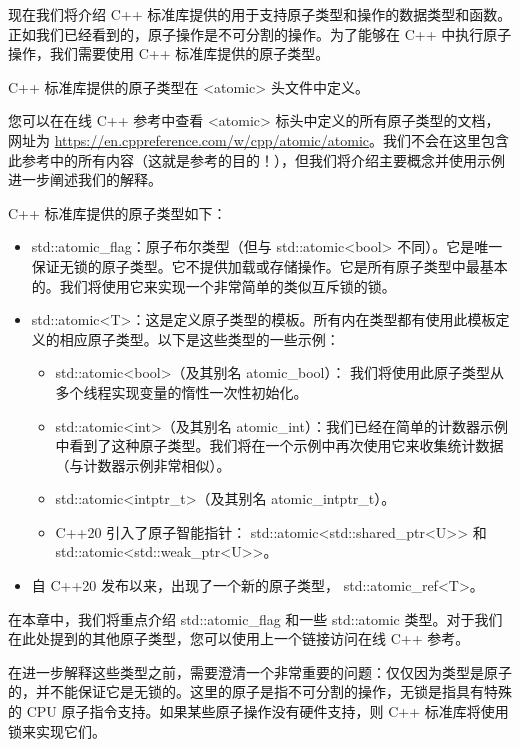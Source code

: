 

现在我们将介绍 C++ 标准库提供的用于支持原子类型和操作的数据类型和函数。正如我们已经看到的，原子操作是不可分割的操作。为了能够在 C++ 中执行原子操作，我们需要使用 C++ 标准库提供的原子类型。



C++ 标准库提供的原子类型在 <atomic> 头文件中定义。

您可以在在线 C++ 参考中查看 <atomic> 标头中定义的所有原子类型的文档，网址为 \url{https://en.cppreference.com/w/cpp/atomic/atomic}。我们不会在这里包含此参考中的所有内容（这就是参考的目的！），但我们将介绍主要概念并使用示例进一步阐述我们的解释。

C++ 标准库提供的原子类型如下：

\begin{itemize}
\item
std::atomic\_flag：原子布尔类型（但与 std::atomic<bool> 不同）。它是唯一保证无锁的原子类型。它不提供加载或存储操作。它是所有原子类型中最基本的。我们将使用它来实现一个非常简单的类似互斥锁的锁。

\item
std::atomic<T>：这是定义原子类型的模板。所有内在类型都有使用此模板定义的相应原子类型。以下是这些类型的一些示例：
\begin{itemize}
\item
std::atomic<bool>（及其别名 atomic\_bool）： 我们将使用此原子类型从多个线程实现变量的惰性一次性初始化。

\item
std::atomic<int>（及其别名 atomic\_int）：我们已经在简单的计数器示例中看到了这种原子类型。我们将在一个示例中再次使用它来收集统计数据（与计数器示例非常相似）。

\item
std::atomic<intptr\_t>（及其别名 atomic\_intptr\_t）。

\item
C++20 引入了原子智能指针： std::atomic<std::shared\_ptr<U>> 和 std::atomic<std::weak\_ptr<U>{}>。
\end{itemize}

\item
自 C++20 发布以来，出现了一个新的原子类型， std::atomic\_ref<T>。
\end{itemize}

在本章中，我们将重点介绍 std::atomic\_flag 和一些 std::atomic 类型。对于我们在此处提到的其他原子类型，您可以使用上一个链接访问在线 C++ 参考。

在进一步解释这些类型之前，需要澄清一个非常重要的问题：仅仅因为类型是原子的，并不能保证它是无锁的。这里的原子是指不可分割的操作，无锁是指具有特殊的 CPU 原子指令支持。如果某些原子操作没有硬件支持，则 C++ 标准库将使用锁来实现它们。

